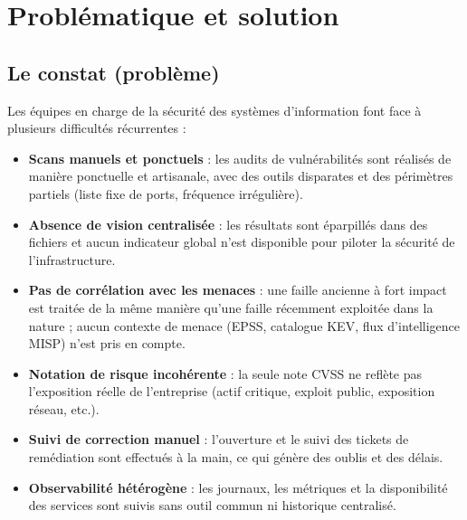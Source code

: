 
\section{Probl\'ematique et solution}

\subsection{Le constat (probl\`eme)}

Les \'equipes en charge de la s\'ecurit\'e des syst\`emes d'information font
face \`a plusieurs difficult\'es r\'ecurrentes :

\begin{itemize}[leftmargin=1.6em]
  \item \textbf{Scans manuels et ponctuels} : les audits de vuln\'erabilit\'es
        sont r\'ealis\'es de mani\`ere ponctuelle et artisanale, avec des
        outils disparates et des p\'erim\`etres partiels (liste fixe de ports,
        fr\'equence irr\'eguli\`ere).
  \item \textbf{Absence de vision centralis\'ee} : les r\'esultats sont
        \'eparpill\'es dans des fichiers et aucun indicateur global n'est
        disponible pour piloter la s\'ecurit\'e de l'infrastructure.
  \item \textbf{Pas de corr\'elation avec les menaces} : une faille ancienne
        \`a fort impact est trait\'ee de la m\^eme mani\`ere qu'une faille
        r\'ecemment exploit\'ee dans la nature ; aucun contexte de menace
        (EPSS, catalogue KEV, flux d'intelligence MISP) n'est pris en compte.
  \item \textbf{Notation de risque incoh\'erente} : la seule note CVSS ne
        refl\`ete pas l'exposition r\'eelle de l'entreprise (actif critique,
        exploit public, exposition r\'eseau, etc.).
  \item \textbf{Suivi de correction manuel} : l'ouverture et le suivi des
        tickets de rem\'ediation sont effectu\'es \`a la main, ce qui
        g\'en\`ere des oublis et des d\'elais.
  \item \textbf{Observabilit\'e h\'et\'erog\`ene} : les journaux, les
        m\'etriques et la disponibilit\'e des services sont suivis sans outil
        commun ni historique centralis\'e.
\end{itemize}

